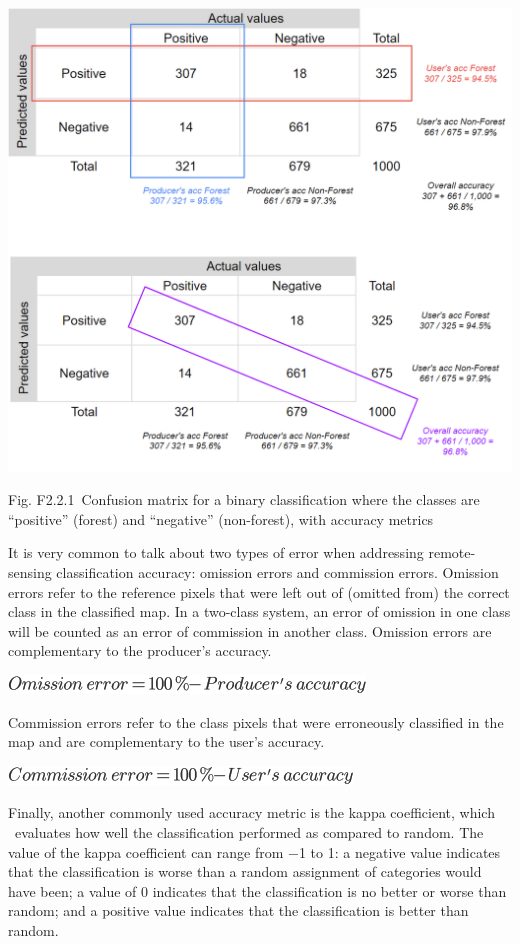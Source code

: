 \documentclass[
  letterpaper,
  DIV=11,
  numbers=noendperiod]{scrreprt}
\begin{document}
\includegraphics{./F2/image43.png}

Fig. F2.2.1~Confusion matrix for a binary classification where the
classes are ``positive'' (forest) and ``negative'' (non-forest), with
accuracy metrics

It is very common to talk about two types of error when addressing
remote-sensing classification accuracy: omission errors and commission
errors. Omission errors refer to the reference pixels that were left out
of (omitted from) the correct class in the classified map. In a
two-class system, an error of omission in one class will be counted as
an error of commission in another class. Omission errors are
complementary to the producer's accuracy.

\includegraphics{./F2/image16.png}~

Commission errors refer to the class pixels that were erroneously
classified in the map and are complementary to the user's accuracy.

\includegraphics{./F2/image17.png}

Finally, another commonly used accuracy metric is the kappa coefficient,
which ~evaluates how well the classification performed as compared to
random. The value of the kappa coefficient can range from −1 to 1: a
negative value indicates that the classification is worse than a random
assignment of categories would have been; a value of 0 indicates that
the classification is no better or worse than random; and a positive
value indicates that the classification is better than random.
\end{document}
